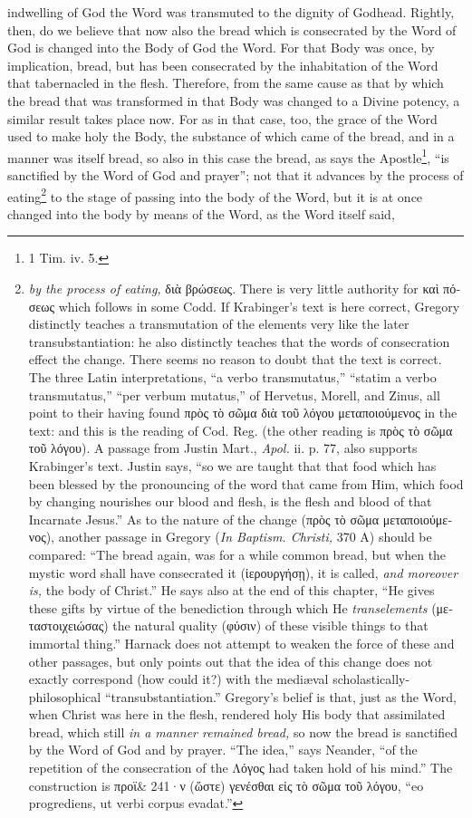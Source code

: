 indwelling of God the Word was transmuted to the dignity of Godhead. Rightly, then, do we believe that now also the bread which is consecrated by the Word of God is changed into the Body of God the Word. For that Body was once, by implication, bread, but has been consecrated by the inhabitation of the Word that tabernacled in the flesh. Therefore, from the same cause as that by which the bread that was transformed in that Body was changed to a Divine potency, a similar result takes place now. For as in that case, too, the grace of the Word used to make holy the Body, the substance of which came of the bread, and in a manner was itself bread, so also in this case the bread, as says the Apostle\footnote{1 Tim. iv. 5.}, “is sanctified by the Word of God and prayer”; not that it advances by the process of eating\footnote{\emph{by the process of eating,} \textgreek{διὰ βρώσεως}. There is very little authority for \textgreek{καὶ πόσεως} which follows in some Codd. If Krabinger’s text is here correct, Gregory distinctly teaches a transmutation of the elements very like the later transubstantiation: he also distinctly teaches that the words of consecration effect the change. There seems no reason to doubt that the text is correct. The three Latin interpretations, “a verbo transmutatus,” “statim a verbo transmutatus,” “per verbum mutatus,” of Hervetus, Morell, and Zinus, all point to their having found \textgreek{πρὸς τὸ σῶμα διὰ τοῦ λόγου μεταποιούμενος} in the text: and this is the reading of Cod. Reg. (the other reading is \textgreek{πρὸς τὸ σῶμα τοῦ λόγου}). A passage from Justin Mart., \emph{Apol.} ii. p. 77, also supports Krabinger’s text. Justin says, “so we are taught that that food which has been blessed by the pronouncing of the word that came from Him, which food by changing nourishes our blood and flesh, is the flesh and blood of that Incarnate Jesus.” As to the nature of the change (\textgreek{πρὸς τὸ σῶμα μεταποιούμενος}), another passage in Gregory (\emph{In Baptism. Christi,} 370 A) should be compared: “The bread again, was for a while common bread, but when the mystic word shall have consecrated it (\textgreek{ἱερουργήσῃ}), it is called, \emph{and moreover is,} the body of Christ.” He says also at the end of this chapter, “He gives these gifts by virtue of the benediction through which He \emph{transelements} (\textgreek{μεταστοιχειώσας}) the natural quality (\textgreek{φύσιν}) of these visible things to that immortal thing.” Harnack does not attempt to weaken the force of these and other passages, but only points out that the idea of this change does not exactly correspond (how could it?) with the mediæval scholastically-philosophical “transubstantiation.” Gregory’s belief is that, just as the Word, when Christ was here in the flesh, rendered holy His body that assimilated bread, which still \emph{in a manner remained bread,} so now the bread is sanctified by the Word of God and by prayer. “The idea,” says Neander, “of the repetition of the consecration of the \textgreek{Λόγος} had taken hold of his mind.” The construction is \textgreek{προϊ\& 241·ν (ὥστε) γενέσθαι εἰς τὸ σῶμα τοῦ λόγου}, “eo progrediens, ut verbi corpus evadat.”} to the stage of passing into the body of the Word, but it is at once changed into the body by means of the Word, as the Word itself said, 